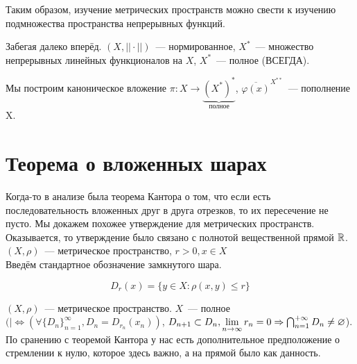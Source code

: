 \documentclass[document]{subfiles}
\begin{document}
Таким образом, изучение метрических пространств можно свести к изучению подмножества пространства непрерывных функций.
\begin{remark}
    Забегая далеко вперёд.
    $(X, || \cdot ||)$~--- нормированное, $X^*$~--- множество непрерывных линейных функционалов на $X$, $X^*$~--- полное (ВСЕГДА).

    Мы построим каноническое вложение $\pi: X \rightarrow \underbrace{(X^*)^*}_{\text{полное}}$,
    $\overline{\varphi(x)}^{X^{**}}$~--- пополнение X.
\end{remark}


\section{Теорема о вложенных шарах}

Когда-то в анализе была теорема Кантора о том, что если есть последовательность вложенных друг в друга отрезков, то их пересечение не пусто. Мы докажем похожее утверждение для метрических пространств. Оказывается, то утверждение
было связано с полнотой вещественной прямой $\mathbb{R}$.
$(X, \rho)$~--- метрическое пространство, $r > 0, x \in X$ \\
Введём стандартное обозначение замкнутого шара. 

\[ D_r(x) = \{ y \in X: \rho(x,y) \leq r\}\]

\begin{theorem}
    $(X, \rho)$~--- метрическое пространство. $X$~--- полное $(|\Leftrightarrow (\forall \{D_n \}^\infty_{n=1}, D_n = D_{r_n}(x_n))$, $D_{n+1} \subset D_n, 
    \lim\limits_{n \to \infty} r_n = 0 \Rightarrow \bigcap^{+\infty}_{n=1} D_n \neq \varnothing$).
    По сранению с теоремой Кантора у нас есть дополнительное предположение о стремлении к нулю, которое здесь важно, а на прямой было как данность.
\end{theorem}
\end{document}
